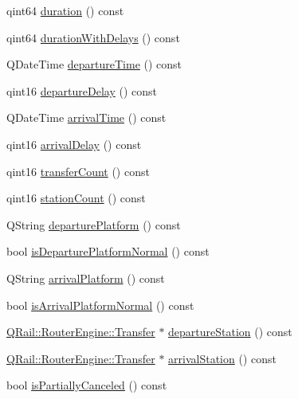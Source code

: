 \begin{DoxyCompactItemize}
\item 
qint64 \mbox{\hyperlink{classQRail_1_1RouterEngine_1_1Route_a799b15f57d18e4a06d9bf9df10bd5478}{duration}} () const
\item 
qint64 \mbox{\hyperlink{classQRail_1_1RouterEngine_1_1Route_aa94695b4a781d26eb8c8a4d314ac0ed6}{duration\+With\+Delays}} () const
\item 
Q\+Date\+Time \mbox{\hyperlink{classQRail_1_1RouterEngine_1_1Route_add11a442094049aa98e9c6e3bd0f87ee}{departure\+Time}} () const
\item 
qint16 \mbox{\hyperlink{classQRail_1_1RouterEngine_1_1Route_a7578f0463317c58665d96976d88a8066}{departure\+Delay}} () const
\item 
Q\+Date\+Time \mbox{\hyperlink{classQRail_1_1RouterEngine_1_1Route_a848b871103beedbc3d1105e95bc8a74e}{arrival\+Time}} () const
\item 
qint16 \mbox{\hyperlink{classQRail_1_1RouterEngine_1_1Route_a98ab7ca5c9bb67348f64eae41750f86f}{arrival\+Delay}} () const
\item 
qint16 \mbox{\hyperlink{classQRail_1_1RouterEngine_1_1Route_a050c21366504769b75112f28795c3dea}{transfer\+Count}} () const
\item 
qint16 \mbox{\hyperlink{classQRail_1_1RouterEngine_1_1Route_af2e7e13f00ef8079750a7012af2674e4}{station\+Count}} () const
\item 
Q\+String \mbox{\hyperlink{classQRail_1_1RouterEngine_1_1Route_ae442bf6397b5371cbf312b02b475d400}{departure\+Platform}} () const
\item 
bool \mbox{\hyperlink{classQRail_1_1RouterEngine_1_1Route_ad7f0d8df720b0ce9cf93037537db2067}{is\+Departure\+Platform\+Normal}} () const
\item 
Q\+String \mbox{\hyperlink{classQRail_1_1RouterEngine_1_1Route_a0d6710f4d8de4c5cb6cb0497c07e0a13}{arrival\+Platform}} () const
\item 
bool \mbox{\hyperlink{classQRail_1_1RouterEngine_1_1Route_a62c9bf4d8a4d469209e53a69b0b0b97d}{is\+Arrival\+Platform\+Normal}} () const
\item 
\mbox{\hyperlink{classQRail_1_1RouterEngine_1_1Transfer}{Q\+Rail\+::\+Router\+Engine\+::\+Transfer}} $\ast$ \mbox{\hyperlink{classQRail_1_1RouterEngine_1_1Route_a701ee12679ec806caf823b9b81ab5fac}{departure\+Station}} () const
\item 
\mbox{\hyperlink{classQRail_1_1RouterEngine_1_1Transfer}{Q\+Rail\+::\+Router\+Engine\+::\+Transfer}} $\ast$ \mbox{\hyperlink{classQRail_1_1RouterEngine_1_1Route_a027668889cddf1a31b536c7a0c4de8c8}{arrival\+Station}} () const
\item 
bool \mbox{\hyperlink{classQRail_1_1RouterEngine_1_1Route_a8daf1b60443b10ba4c730121c8e3dbe0}{is\+Partially\+Canceled}} () const
\end{DoxyCompactItemize}


